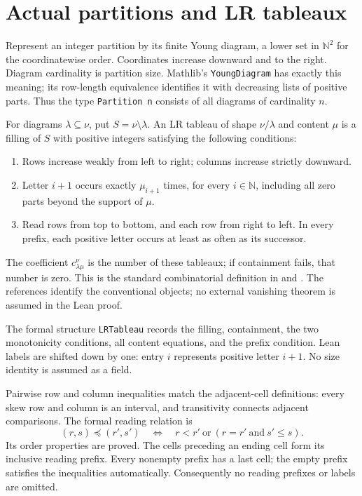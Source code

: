 \documentclass[11pt]{article}
\newcommand{\N}{\mathbb N}
\begin{document}
\section{Actual partitions and LR tableaux}
Represent an integer partition by its finite Young diagram, a lower set in
$\N^2$ for the coordinatewise order. Coordinates increase downward and to
the right. Diagram cardinality is partition size. Mathlib's
\texttt{YoungDiagram} has exactly this meaning; its row-length equivalence
identifies it with decreasing lists of positive parts. Thus the type
\texttt{Partition n} consists of all diagrams of cardinality $n$.

For diagrams $\lambda\subseteq\nu$, put $S=\nu\setminus\lambda$.
An LR tableau of shape $\nu/\lambda$ and content $\mu$ is a filling of $S$
with positive integers satisfying the following conditions:
\begin{enumerate}
\item Rows increase weakly from left to right; columns increase strictly downward.
\item Letter $i+1$ occurs exactly $\mu_{i+1}$ times, for every $i\in\N$,
      including all zero parts beyond the support of $\mu$.
\item Read rows from top to bottom, and each row from right to left.
      In every prefix, each positive letter occurs at least as often as its successor.
\end{enumerate}
The coefficient $c^\nu_{\lambda\mu}$ is the number of these tableaux;
if containment fails, that number is zero. This is the standard combinatorial
definition in \cite[Definition 2.1]{hahn} and \cite[Section 2]{gutschwager}.
The references identify the conventional objects; no external vanishing
theorem is assumed in the Lean proof.

The formal structure \texttt{LRTableau} records the filling, containment,
the two monotonicity conditions, all content equations, and the prefix
condition. Lean labels are shifted down by one: entry $i$ represents positive
letter $i+1$. No size identity is assumed as a field.

Pairwise row and column inequalities match the adjacent-cell definitions:
every skew row and column is an interval, and transitivity connects adjacent
comparisons. The formal reading relation is
\[
 (r,s)\preceq(r',s')\quad\Longleftrightarrow\quad
 r<r'\ \text{or}\ (r=r'\ \text{and}\ s'\le s).
\]
Its order properties are proved. The cells preceding an ending cell form
its inclusive reading prefix. Every nonempty prefix has a last cell; the
empty prefix satisfies the inequalities automatically. Consequently no
reading prefixes or labels are omitted.
\end{document}
